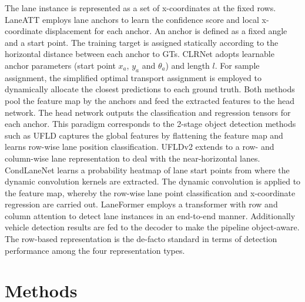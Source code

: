\documentclass[10pt,twocolumn,letterpaper]{article}
\begin{document}
 The lane instance is represented as a set of x-coordinates at the fixed rows. LaneATT \cite{tabelini2021cvpr} employs lane anchors to learn the confidence score and local x-coordinate displacement for each anchor. An anchor is defined as a fixed angle and a start point. The training target is assigned statically according to the horizontal distance between each anchor to GTs. CLRNet \cite{Zheng_2022_CVPR} adopts learnable anchor parameters (start point $x_a$, $y_a$ and $\theta_a$) and length $l$.  For sample assignment, the simplified optimal transport assignment \cite{YOLOX} is employed to dynamically allocate the closest predictions to each ground truth. 
Both methods pool the feature map by the anchors and feed the extracted features to the head network. The head network outputs the classification and regression tensors for each anchor. This paradigm corresponds to the 2-stage object detection methods such as \cite{fpn, maskrcnn}
UFLD \cite{qin2020ultra} captures the global features by flattening the feature map and learns row-wise lane position classification. UFLDv2 \cite{qin2022ultrav2} extends \cite{qin2020ultra} to a row- and column-wise lane representation to deal with the near-horizontal lanes. 
CondLaneNet \cite{Liu_2021_ICCV} learns a probability heatmap of lane start points from where the dynamic convolution kernels are extracted. The dynamic convolution is applied to the feature map, whereby the row-wise lane point classification and x-coordinate regression are carried out.
LaneFormer \cite{laneformer2022} employs a transformer with row and column attention to detect lane instances in an end-to-end manner. Additionally vehicle detection results are fed to the decoder to make the pipeline object-aware. The row-based representation is the de-facto standard in terms of detection performance among the four representation types. 

\section{Methods}
\end{document}
